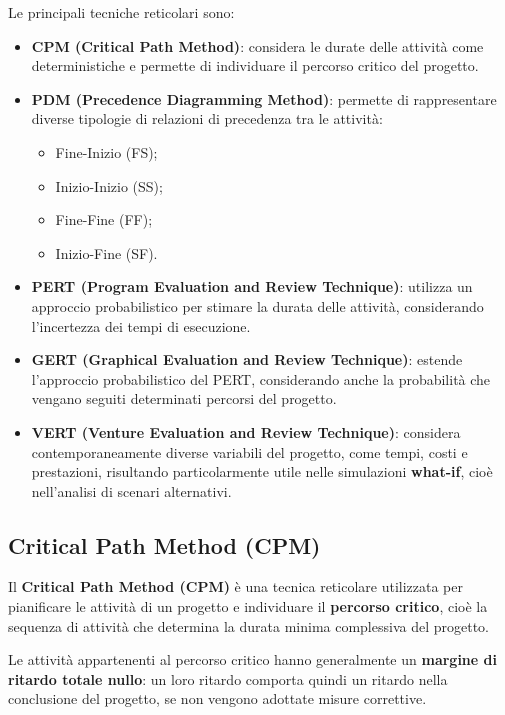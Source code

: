 \noindent Le principali tecniche reticolari sono:

\begin{itemize}
    \item \textbf{CPM (Critical Path Method)}: considera le durate delle attività come deterministiche e permette di individuare il percorso critico del progetto.

    \item \textbf{PDM (Precedence Diagramming Method)}: permette di rappresentare diverse tipologie di relazioni di precedenza tra le attività:
    \begin{itemize}
        \item Fine-Inizio (FS);
        \item Inizio-Inizio (SS);
        \item Fine-Fine (FF);
        \item Inizio-Fine (SF).
    \end{itemize}

    \item \textbf{PERT (Program Evaluation and Review Technique)}: utilizza un approccio probabilistico per stimare la durata delle attività, considerando l'incertezza dei tempi di esecuzione.

    \item \textbf{GERT (Graphical Evaluation and Review Technique)}: estende l'approccio probabilistico del PERT, considerando anche la probabilità che vengano seguiti 
    determinati percorsi del progetto.

    \item \textbf{VERT (Venture Evaluation and Review Technique)}: considera contemporaneamente diverse variabili del progetto, come tempi, costi e prestazioni, 
    risultando particolarmente utile nelle simulazioni \textbf{what-if}, cioè nell'analisi di scenari alternativi.
\end{itemize}

\subsection{Critical Path Method (CPM)}

\noindent Il \textbf{Critical Path Method (CPM)} è una tecnica reticolare utilizzata per pianificare le attività di un progetto e 
individuare il \textbf{percorso critico}, cioè la sequenza di attività che determina la durata minima complessiva del progetto.

\medskip

\noindent Le attività appartenenti al percorso critico hanno generalmente un \textbf{margine di ritardo totale nullo}: un loro ritardo 
comporta quindi un ritardo nella conclusione del progetto, se non vengono adottate misure correttive.

